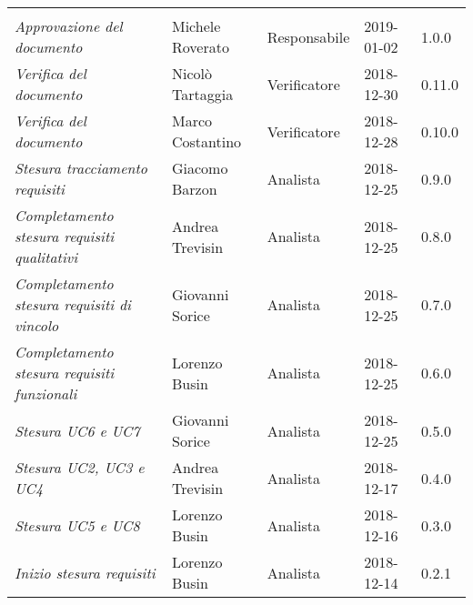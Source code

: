 \newpage 
\section*{}
\begin{table}[H]
	\centering
	\begin{tabular}{p{4cm}|C{3cm}|C{3cm}|R{2.5cm}|R{2cm}}
		
		 & & & & \\
		
		
		\emph{Approvazione del documento} & Michele Roverato & Responsabile & 2019-01-02 & 1.0.0 \\
		\hline
		
		\emph{Verifica del documento} & Nicolò Tartaggia & Verificatore & 2018-12-30 & 0.11.0 \\
		\hline
		
		\emph{Verifica del documento} & Marco Costantino & Verificatore & 2018-12-28 & 0.10.0 \\
		\hline
		
		\emph{Stesura tracciamento requisiti} & Giacomo Barzon & Analista & 2018-12-25 & 0.9.0 \\
		\hline
		
		\emph{Completamento stesura requisiti qualitativi} & Andrea Trevisin & Analista & 2018-12-25 & 0.8.0 \\
		\hline
		
		\emph{Completamento stesura requisiti di vincolo} & Giovanni Sorice & Analista & 2018-12-25 & 0.7.0 \\
		\hline
		
		\emph{Completamento stesura requisiti funzionali} & Lorenzo Busin & Analista & 2018-12-25 & 0.6.0 \\
		\hline
		
		\emph{Stesura UC6 e UC7} & Giovanni Sorice & Analista & 2018-12-25 & 0.5.0 \\
		\hline
		
		\emph{Stesura UC2, UC3 e UC4} & Andrea Trevisin & Analista & 2018-12-17 & 0.4.0 \\
		\hline
		
		\emph{Stesura UC5 e UC8} & Lorenzo Busin & Analista & 2018-12-16 & 0.3.0 \\
		\hline
		
		\emph{Inizio stesura requisiti} & Lorenzo Busin & Analista & 2018-12-14 & 0.2.1 \\
		\hline
		

\end{tabular}
\end{table}
